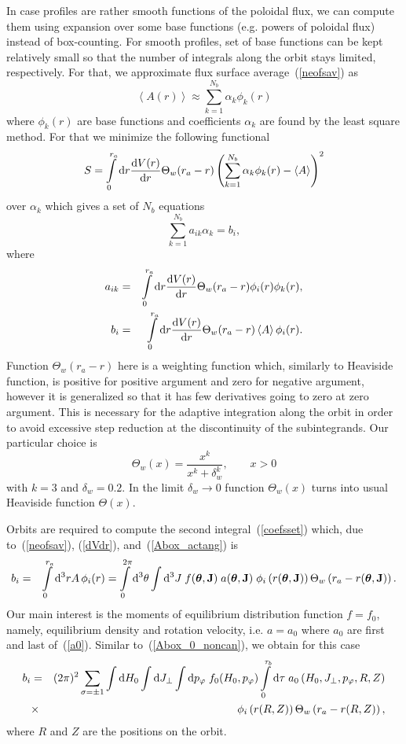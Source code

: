 \documentclass[preprint,prb,aps]{revtex4-1}
\newcommand{\be}[1]{\begin{equation} \label{#1}}
\newcommand{\ee}{\end{equation}}
\newcommand{\bea}[1]{\begin{eqnarray} \label{#1}}
\newcommand{\eea}{\end{eqnarray}}
\newcommand{\eq}[1]{(\ref{#1})}
\newcommand{\bJ}{{\bf J}}
\newcommand{\btheta}{{\boldsymbol\theta}}
\newcommand{\rd}{{\rm d}}
\begin{document}
\noindent
In case profiles are rather smooth functions of the poloidal flux, we can compute them
using expansion over some base functions (e.g. powers of poloidal flux) 
instead of box-counting. For smooth profiles, set of base functions can be kept
relatively small so that the number of integrals along the orbit stays limited, respectively.
For that, we approximate flux surface average~\eq{neofsav} as
\be{basexp}
\left\langle A(r) \right\rangle \approx \sum\limits_{k=1}^{N_b} \alpha_k \phi_k(r)
\ee
where $\phi_k(r)$ are base functions and coefficients $\alpha_k$ are found by the least 
square method. For that we minimize the following functional
\be{functional}
S=\int\limits_0^{r_a}\rd r \frac{\rd V(r)}{\rd r}
\Theta_w(r_a-r)
\left(
\sum\limits_{k=1}^{N_b} \alpha_k \phi_k(r)-\left\langle A \right\rangle
\right)^2
\ee
over $\alpha_k$
which gives a set of $N_b$ equations
\be{set}
\sum\limits_{k=1}^{N_b}a_{ik} \alpha_k = b_i,
\ee
where
\bea{coefsset}
a_{ik} &=& \int\limits_0^{r_a}\rd r \frac{\rd V(r)}{\rd r} \Theta_w(r_a-r)
\phi_i(r) \phi_k(r),
\nonumber \\
b_i &=& \int\limits_0^{r_a}\rd r \frac{\rd V(r)}{\rd r}\Theta_w(r_a-r) 
\left\langle A \right\rangle \phi_i(r).
\eea
Function $\Theta_w(r_a-r)$ here is a weighting function which, similarly to
Heaviside function, is positive for positive argument and zero for negative 
argument, however it is generalized so that it has few derivatives going to 
zero at zero argument. This is necessary for the adaptive integration along 
the orbit in order to avoid excessive step reduction at the discontinuity of
the subintegrands. Our particular choice is
\be{Theta_W_def}
\Theta_w(x)=\frac{x^k}{x^k+\delta_w^k},\qquad x>0
\ee
with $k=3$ and $\delta_w = 0.2$. In the limit $\delta_w\rightarrow 0$ function
$\Theta_w(x)$ turns into usual Heaviside function $\Theta(x)$.

Orbits are required to compute the second integral~\eq{coefsset} which, 
due to~\eq{neofsav}, \eq{dVdr}, 
and~\eq{Abox_actang} is
\bea{biviaorbs}
b_i &=& \int\limits_0^{r_a}\rd^3 r A\, \phi_i(r)
=
\int\limits_0^{2\pi}\rd^3 \theta \int \rd^3 J\; f(\btheta,\bJ)\; a(\btheta,\bJ)\; 
\phi_i\left(r(\btheta,\bJ)\right) \Theta_w\left(r_a-r(\btheta,\bJ)\right).
\eea
Our main interest is the moments of equilibrium distribution function $f=f_0$, namely,
equilibrium density and rotation velocity, i.e. $a=a_0$ where $a_0$ are first and last
of~\eq{a0}. Similar to~\eq{Abox_0_noncan}, we obtain for this case
\bea{bj0}
b_i &=& (2\pi)^2\sum_{\sigma=\pm 1}
\int \rd H_0\int\rd J_\perp\int\rd p_\varphi
\;f_0(H_0,p_\varphi)
\int\limits_0^{\tau_b}\rd \tau\;
a_0\left(H_0,J_\perp,p_\varphi,R,Z\right)
\nonumber \\
&\times&
\phi_i\left(r(R,Z)\right)
\Theta_w\left(r_a-r(R,Z)\right),
\eea
where $R$ and $Z$ are the positions on the orbit.
\end{document}
